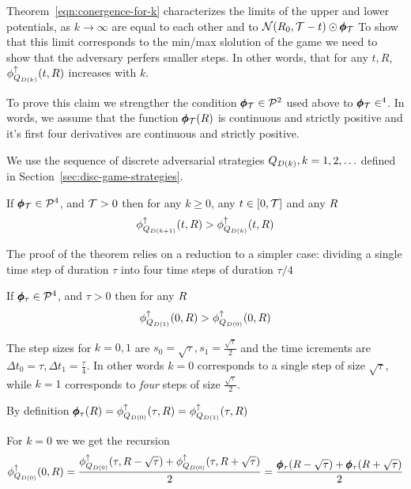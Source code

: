 \documentclass{article}[12pt]
\begin{document}
Theorem~\ref{eqn:conergence-for-k} characterizes the limits of the
upper and lower potentials, as $k \to \infty$ are equal to each other
and to ${\cal N}(R_0,\mathcal{T}-t) \odot \pmb{\phi}_{\mathcal{T}}$ To show that this
limit corresponds to the min/max slolution of the game we need to show
that the adversary perfers smaller steps. In other words, that
for any $t,R$, $\phi_{Q_{D(k)}}^{\uparrow}(t,R)$ increases with $k$.

To prove this claim we strengther the condition $\pmb{\phi}_{\mathcal{T}} \in {\cal P}^{2}$ used above to $\pmb{\phi}_{\mathcal{T}} \in \sp{4}$. In words, we assume that the function $\pmb{\phi}_{\mathcal{T}}(R)$ is continuous and strictly positive and it's first four derivatives are continuous and strictly positive.

We use the sequence of discrete adversarial strategies
$Q_{D(k)}, k=1,2,\ldots$ defined in
Section~\ref{sec:disc-game-strategies}.

\begin{theorem}\label{thm:smallerSteps}
  If $ \pmb{\phi}_{\mathcal{T}} \in {\cal P}^{4}$, and $\mathcal{T}>0$  
  then for any $k\geq 0$, any $t \in [0,\mathcal{T}]$ and any $R$
  $$\phi_{Q_{D(k+1)}}^{\uparrow}(t,R) >  \phi_{Q_{D(k)}}^{\uparrow}(t,R)$$
\end{theorem}

The proof of the theorem relies on a reduction to a simpler case:
dividing a single time step of duration $\tau$ into four time steps of duration  $\tau/4$

\begin{lemma} \label{lemma:half-step}
  If $ \pmb{\phi}_{\tau} \in {\cal P}^{4}$, and $\tau>0$ then for any $R$
  $$\phi_{Q_{D(1)}}^{\uparrow}(0,R) >  \phi_{Q_{D(0)}}^{\uparrow}(0,R)$$
\end{lemma}
  
\proof The step sizes for $k=0,1$ are
$s_0=\sqrt{\tau}, s_1=\frac{\sqrt{\tau}}{2}$ and the time icrements
are $\Delta t_0=\tau, \Delta t_1=\frac{\tau}{4}$. 
In other words $k=0$ corresponds to a single step of size $\sqrt{\tau}$, while $k=1$ corresponds
to {\em four} steps of size $\frac{\sqrt{\tau}}{2}$.

By definition $\pmb{\phi}_{\tau}(R)=\phi_{Q_{D(0)}}^{\uparrow}(\tau,R)=\phi_{Q_{D(1)}}^{\uparrow}(\tau,R)$

For $k=0$ we we get the recursion
\begin{equation}  \label{eqn:pot-recursion-0}
  \phi_{Q_{D(0)}}^{\uparrow}(0, R) =
  \frac{\phi_{Q_{D(0)}}^{\uparrow}(\tau,R-\sqrt{\tau})+
    \phi_{Q_{D(0)}}^{\uparrow}(\tau,R+\sqrt{\tau})}{2}
  =   \frac{\pmb{\phi}_{\tau}(R-\sqrt{\tau})+
    \pmb{\phi}_{\tau}(R+\sqrt{\tau})}{2}
\end{equation}
\end{document}
